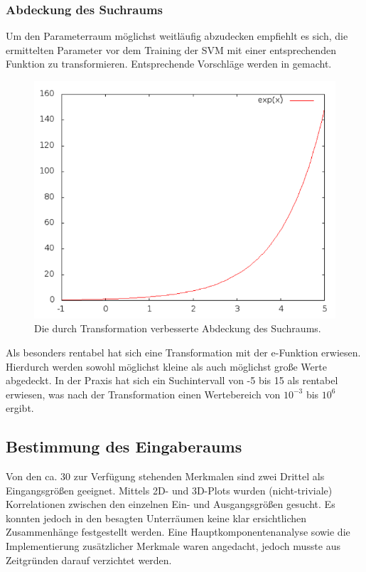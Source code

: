 \subsubsection{Abdeckung des Suchraums}
\label{subsubsec:AbdeckungDesSuchraums}
Um den Parameterraum möglichst weitläufig abzudecken empfiehlt es sich, die ermittelten Parameter vor dem Training der SVM mit einer entsprechenden Funktion zu transformieren. Entsprechende Vorschläge werden in \cite{HsuLibsvmTutorial2003, Staelin2002} gemacht.

\begin{figure}[!h]
	\centering
	\includegraphics[scale=1.0]{images/svm/Abdeckung Suchraum.png} 
	\caption{Die durch Transformation verbesserte Abdeckung des Suchraums.}
	\label{fig:AbdeckungSuchraum}
\end{figure}

Als besonders rentabel hat sich eine Transformation mit der e-Funktion erwiesen. Hierdurch werden sowohl möglichst kleine als auch möglichst große Werte abgedeckt. In der Praxis hat sich ein Suchintervall von -5 bis 15 als rentabel erwiesen, was nach der Transformation einen Wertebereich von $10^{-3}$ bis $10^{6}$ ergibt.

\subsection{Bestimmung des Eingaberaums}
\label{subsec:BestimmungDesEingaberaums}
Von den ca. 30 zur Verfügung stehenden Merkmalen sind zwei Drittel als Eingangsgrößen geeignet.  Mittels 2D- und 3D-Plots wurden (nicht-triviale) Korrelationen zwischen den einzelnen Ein- und Ausgangsgrößen gesucht. Es konnten jedoch in den besagten Unterräumen keine klar ersichtlichen Zusammenhänge festgestellt werden. Eine Hauptkomponentenanalyse sowie die Implementierung zusätzlicher Merkmale waren angedacht, jedoch musste aus Zeitgründen darauf verzichtet werden.

